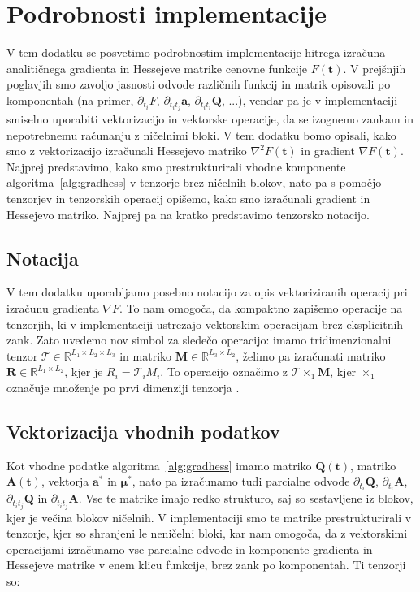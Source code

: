 \documentclass[isrm2, tisk]{fmfdelo}
\newcommand{\aimplicit}{\bar{\mathbf{a}}}
\newcommand{\qmat}{\mathbf{Q}}
\newcommand{\amat}{\mathbf{A}}
\newcommand{\avec}{\mathbf{a}}
\newcommand{\tvec}{\mathbf{t}}
\newcommand{\muvec}{\boldsymbol{\mu}}
\begin{document}
\section{Podrobnosti implementacije}
\label{app:implementation}
V tem dodatku se posvetimo podrobnostim implementacije hitrega izračuna analitičnega gradienta in Hessejeve matrike cenovne funkcije $F(\tvec)$. V prejšnjih poglavjih smo zavoljo jasnosti odvode različnih funkcij in matrik opisovali po komponentah (na primer, $\partial_{t_i} F$, $\partial_{t_i t_j} \aimplicit$, $\partial_{t_it_i} \qmat$, ...), vendar pa je v implementaciji smiselno uporabiti vektorizacijo in vektorske operacije, da se izognemo zankam in nepotrebnemu računanju z ničelnimi bloki. V tem dodatku bomo opisali, kako smo z vektorizacijo izračunali Hessejevo matriko $\nabla^2 F(\tvec)$ in gradient $\nabla F(\tvec)$. Najprej predstavimo, kako smo prestrukturirali vhodne komponente algoritma~\ref{alg:gradhess} v tenzorje brez ničelnih blokov, nato pa s pomočjo tenzorjev in tenzorskih operacij opišemo, kako smo izračunali gradient in Hessejevo matriko. Najprej pa na kratko predstavimo tenzorsko notacijo.

\subsection{Notacija}

V tem dodatku uporabljamo posebno notacijo za opis vektoriziranih operacij pri izračunu gradienta $\nabla F$. To nam omogoča, da kompaktno zapišemo operacije na tenzorjih, ki v implementaciji ustrezajo vektorskim operacijam brez eksplicitnih zank. Zato uvedemo nov simbol za sledečo operacijo: imamo tridimenzionalni tenzor $\mathcal{T} \in \mathbb{R}^{L_1 \times L_2 \times L_3}$ in matriko $\mathbf{M} \in \mathbb{R}^{L_3 \times L_2}$, želimo pa izračunati matriko $\mathbf{R} \in \mathbb{R}^{L_1 \times L_2}$, kjer je $R_i = \mathcal{T}_i M_i$. To operacijo označimo z $\mathcal{T} \times_1 \mathbf{M}$, kjer $\times_1$ označuje množenje po prvi dimenziji tenzorja \cite{kolda2009tensor}. 

\subsection{Vektorizacija vhodnih podatkov}
Kot vhodne podatke algoritma~\ref{alg:gradhess} imamo matriko $\qmat(\tvec)$, matriko $\amat(\tvec)$, vektorja $\avec^*$ in $\muvec^*$, nato pa izračunamo tudi parcialne odvode $\partial_{t_i}\qmat$, $\partial_{t_i} \amat$, $\partial_{t_it_j}\qmat$ in $\partial_{t_it_j}\amat$. Vse te matrike imajo redko strukturo, saj so sestavljene iz blokov, kjer je večina blokov ničelnih. V implementaciji smo te matrike prestrukturirali v tenzorje, kjer so shranjeni le neničelni bloki, kar nam omogoča, da z vektorskimi operacijami izračunamo vse parcialne odvode in komponente gradienta in Hessejeve matrike v enem klicu funkcije, brez zank po komponentah. Ti tenzorji so:
\end{document}
